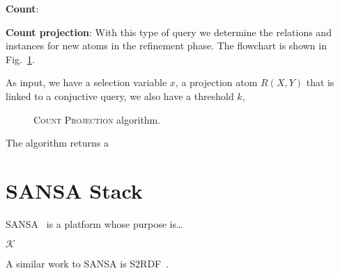 \documentclass{article}
\newcommand{\K}{\mathcal{K}}
\begin{document}
\noindent \textbf{Count}: 

\noindent \textbf{Count projection}: With this type of query we determine the
relations and instances for new atoms in the refinement phase. The flowchart is
shown in Fig.~\ref{fig:select_distinct}. 

As input, we have a selection variable $x$, a projection atom $R(X, Y)$ that is linked
to a conjuctive query, we also have a threshold $k$, 

\begin{figure}[H]
\centering
    \resizebox{!}{0.65\textheight}{%
    
    }
    \caption[\textsc{Count Projection} algorithm.]
    {\textsc{Count Projection} algorithm.
        \newline \newline 
    }
    \label{fig:select_distinct}
\end{figure}

The algorithm returns a

\section{SANSA Stack}

SANSA~\cite{lehmann-2017-sansa-iswc} is a platform whose purpose is\ldots

$\K$

A similar work to SANSA is S2RDF~\cite{schatzle2016s2rdf}.



\end{document}
